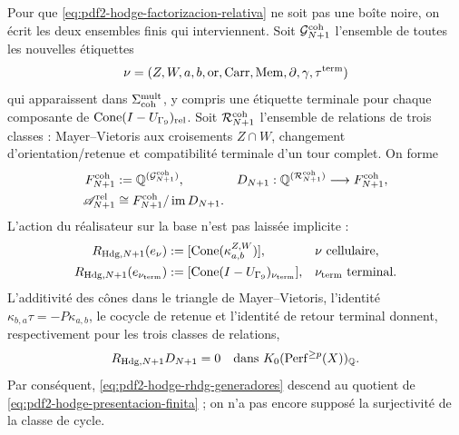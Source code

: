 Pour que \eqref{eq:pdf2-hodge-factorizacion-relativa} ne soit pas une boîte noire,
on écrit les deux ensembles finis qui interviennent. Soit
\(\mathcal G_{N+1}^{\rm coh}\) l'ensemble de toutes les nouvelles étiquettes
\[
 \nu=(Z,W,a,b,\operatorname{or},\operatorname{Carr},
       \operatorname{Mem},\partial,\gamma,\tau^{\rm term})
\]
qui apparaissent dans \(\Sigma_{\rm coh}^{\rm mult}\), y compris une étiquette
terminale pour chaque composante de
\(\operatorname{Cone}(I-U_{\Gamma_9})_{\rm rel}\). Soit
\(\mathcal R_{N+1}^{\rm coh}\) l'ensemble de relations de trois classes :
Mayer--Vietoris aux croisements \(Z\cap W\), changement d'orientation/retenue et
compatibilité terminale d'un tour complet. On forme
\begin{equation}\label{eq:pdf2-hodge-presentacion-finita}
\begin{aligned}
 F_{N+1}^{\rm coh}&:=\mathbb Q^{(\mathcal G_{N+1}^{\rm coh})},&
 D_{N+1}&:\mathbb Q^{(\mathcal R_{N+1}^{\rm coh})}
             \longrightarrow F_{N+1}^{\rm coh},\\
 \mathscr A_{N+1}^{\rm rel}
   &\cong F_{N+1}^{\rm coh}/\operatorname{im}D_{N+1}.&&
\end{aligned}
\end{equation}
L'action du réalisateur sur la base n'est pas laissée implicite :
\begin{equation}\label{eq:pdf2-hodge-rhdg-generadores}
\begin{aligned}
 R_{{\rm Hdg},N+1}(e_\nu)
   &:=[\operatorname{Cone}(\kappa_{a,b}^{Z,W})],
       &&\nu\ \text{cellulaire},\\
 R_{{\rm Hdg},N+1}(e_{\nu_{\rm term}})
   &:=[\operatorname{Cone}(I-U_{\Gamma_9})_{\nu_{\rm term}}],
       &&\nu_{\rm term}\ \text{terminal}.
\end{aligned}
\end{equation}
L'additivité des cônes dans le triangle de Mayer--Vietoris, l'identité
\(\kappa_{b,a}\tau=-P\kappa_{a,b}\), le cocycle de retenue et l'identité de
retour terminal donnent, respectivement pour les trois classes de relations,
\begin{equation}\label{eq:pdf2-hodge-descenso-relaciones}
 R_{{\rm Hdg},N+1}D_{N+1}=0
 \quad\text{dans }K_0(\operatorname{Perf}^{\ge p}(X))_{\mathbb Q}.
\end{equation}
Par conséquent, \eqref{eq:pdf2-hodge-rhdg-generadores} descend au quotient de
\eqref{eq:pdf2-hodge-presentacion-finita} ; on n'a pas encore supposé
la surjectivité de la classe de cycle.

